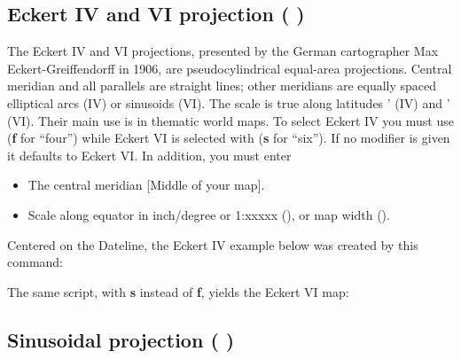 \subsection{Eckert IV and VI projection ( )}


The Eckert IV and VI projections, presented by the German cartographer Max Eckert-Greiffendorff in 1906,
are pseudocylindrical equal-area projections.  Central meridian
and all parallels are straight lines; other meridians are
equally spaced elliptical arcs (IV) or sinusoids (VI).  The scale is
true along latitudes ' (IV) and ' (VI).
Their main use is in thematic world maps.  To select Eckert IV you must
use  (\textbf{f} for ``four'') while Eckert VI is selected with
 (\textbf{s} for ``six'').  If no modifier is given it defaults to
Eckert VI.
In addition, you must enter

\begin{itemize} 
\item The central meridian [Middle of your map].
\item Scale along equator in inch/degree or 1:xxxxx (), or map width ().
\end{itemize} 

Centered on the Dateline, the Eckert IV example below was created by this command:



The same script, with \textbf{s} instead of \textbf{f}, yields the Eckert VI map:



\subsection{Sinusoidal projection ( )}


